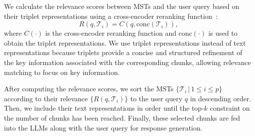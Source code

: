 We calculate the relevance scores between MSTs and the user query based on their triplet representations using a cross-encoder reranking function~\cite{xiao23cpack}:
\begin{equation}
\label{eq:rerank}
R(q,\mathcal{T}_i)=C(q,\text{conc}(\mathcal{T}_i)),
\end{equation}
where $C(\cdot)$ is the cross-encoder reranking function and $\text{conc}(\cdot)$ is used to obtain the triplet representations. We use triplet representations instead of text representations because triplets provide a concise and structured refinement of the key information associated with the corresponding chunks, allowing relevance matching to focus on key information.

After computing the relevance scores, we sort the MSTs $\{\mathcal{T}_i\,|\,1\leq i\leq p\}$ according to their relevance $\{R(q,\mathcal{T}_i)\}$ to the user query $q$ in descending order. Then, we include their text representations in order until the top-$k$ constraint on the number of chunks has been reached. Finally, these selected chunks are fed into the LLMs along with the user query for response generation.
